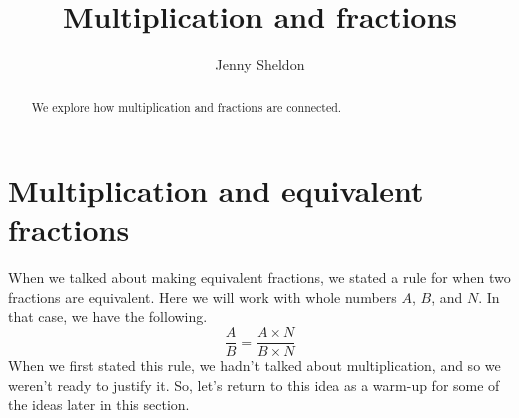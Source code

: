 \documentclass{ximera}
\title{Multiplication and fractions}
\author{Jenny Sheldon}
\begin{document}
\begin{abstract}
We explore how multiplication and fractions are connected.
\end{abstract}
\maketitle






\section{Multiplication and equivalent fractions}

When we talked about making equivalent fractions, we stated a rule for when two fractions are equivalent. Here we will work with whole numbers $A$, $B$, and $N$. In that case, we have the following.
\[
\frac{A}{B} = \frac{A \times N}{B \times N}
\]
When we first stated this rule, we hadn't talked about multiplication, and so we weren't ready to justify it. So, let's return to this idea as a warm-up for some of the ideas later in this section.
\end{document}
